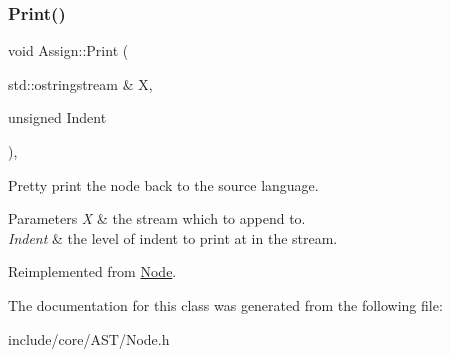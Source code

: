 \mbox{\label{class_assign_a1739f537e350e577898ae2447f928e4a}} 
\subsubsection{\texorpdfstring{Print()}{Print()}}
{\footnotesize\ttfamily void Assign\+::\+Print (\begin{DoxyParamCaption}\item[{std\+::ostringstream \&}]{X,  }\item[{unsigned}]{Indent }\end{DoxyParamCaption})\hspace{0.3cm}{\ttfamily [override]}, {\ttfamily [virtual]}}

Pretty print the node back to the source language. 
\begin{DoxyParams}{Parameters}
{\em X} & the stream which to append to. \\
\hline
{\em Indent} & the level of indent to print at in the stream. \\
\hline
\end{DoxyParams}


Reimplemented from \mbox{\hyperlink{class_node_a5325b760a6e6fe94227c0cff53af2c45}{Node}}.



The documentation for this class was generated from the following file\+:\begin{DoxyCompactItemize}
\item 
include/core/\+A\+S\+T/Node.\+h\end{DoxyCompactItemize}
